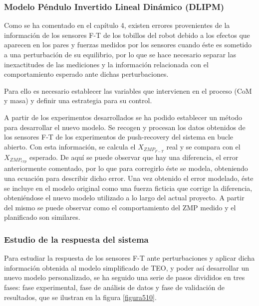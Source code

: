 \subsubsection{Modelo Péndulo Invertido Lineal Dinámico (DLIPM)}\label{DLIPM}

Como se ha comentado en el capítulo 4, existen errores provenientes de la información de los sensores F-T de los tobillos del robot debido a los efectos que aparecen en los pares y fuerzas medidos por los sensores cuando éste es sometido a una perturbación de su equilibrio, por lo que se hace necesario separar las inexactitudes de las mediciones y la información relacionada con el comportamiento esperado ante dichas perturbaciones.

Para ello es necesario establecer las variables que intervienen en el proceso (CoM y masa) y definir una estrategia para su control. 

A partir de los experimentos desarrollados se ha podido establecer un método para desarrollar el nuevo modelo. Se recogen y procesan los datos obtenidos de los sensores F-T de los experimentos de push-recovery del sistema en bucle abierto. Con esta información, se calcula el $X_{ZMP_{F-T}}$ real y se compara con el $X_{ZMP_{exp}}$ esperado. De aquí se puede observar que hay una diferencia, el error anteriormente comentado, por lo que para corregirlo éste se modela, obteniendo una ecuación para describir dicho error. Una vez obtenido el error modelado, éste se incluye en el modelo original como una fuerza ficticia que corrige la diferencia, obteniéndose el nuevo modelo utilizado a lo largo del actual proyecto. A partir del mismo se puede observar como el comportamiento del ZMP medido y el planificado son similares.


\subsubsection{Estudio de la respuesta del sistema}

Para estudiar la respuesta de los sensores F-T ante perturbaciones y aplicar dicha información obtenida al modelo simplificado de TEO, y poder así desarrollar un nuevo modelo personalizado, se ha seguido una serie de pasos divididos en tres fases: fase experimental, fase de análisis de datos y fase de validación de resultados, que se ilustran en la figura \ref{figura510}. 

